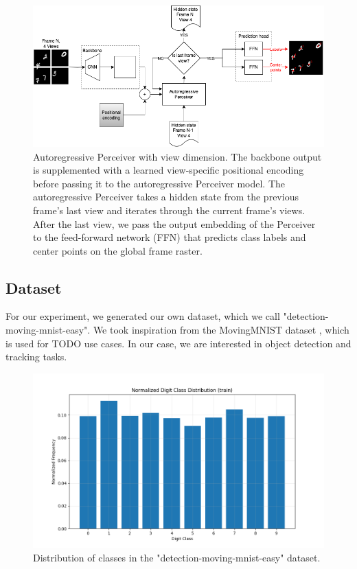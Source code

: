 \begin{figure}
    \centering
    \includegraphics[width=\textwidth]{figures/figure_methods_model_ar_perceiver_views.png}
    \caption{Autoregressive Perceiver with view dimension. The backbone output is supplemented with a learned view-specific positional encoding before passing it to the autoregressive Perceiver model. The autoregressive Perceiver takes a hidden state from the previous frame's last view and iterates through the current frame's views. After the last view, we pass the output embedding of the Perceiver to the feed-forward network (FFN) that predicts class labels and center points on the global frame raster.}
    \label{fig:figure_methods_model_ar_perceiver_views}
\end{figure}


\subsection{Dataset}

For our experiment, we generated our own dataset, which we call "detection-moving-mnist-easy". We took inspiration from the MovingMNIST dataset \cite{srivastava2016unsupervisedlearningvideorepresentations}, which is used for TODO use cases. In our case, we are interested in object detection and tracking tasks.

\begin{figure}
    \centering
    \includegraphics[width=\textwidth]{figures/figure_method_dataset_train_digit_classes.png}
    \caption{Distribution of classes in the "detection-moving-mnist-easy" dataset.}
    \label{fig:figure_method_dataset_train_digit_classes}
\end{figure}

